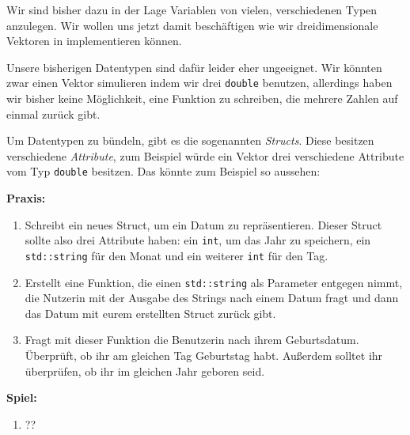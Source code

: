 
Wir sind bisher dazu in der Lage Variablen von vielen, verschiedenen Typen anzulegen.
Wir wollen uns jetzt damit beschäftigen wie wir dreidimensionale Vektoren in \Cpp implementieren können.

Unsere bisherigen Datentypen sind dafür leider eher ungeeignet.
Wir könnten zwar einen Vektor simulieren indem wir drei \texttt{double} benutzen, allerdings haben wir bisher keine Möglichkeit, eine Funktion zu schreiben, die mehrere Zahlen auf einmal zurück gibt.

Um Datentypen zu bündeln, gibt es die sogenannten \emph{Structs}.
Diese besitzen verschiedene \emph{Attribute}, zum Beispiel würde ein Vektor drei verschiedene Attribute vom Typ \texttt{double} besitzen.
Das könnte zum Beispiel so aussehen:


%

\textbf{Praxis:}
\begin{enumerate}
    \item Schreibt ein neues Struct, um ein Datum zu repräsentieren.
Dieser Struct sollte also drei Attribute haben:
    ein \texttt{int}, um das Jahr zu speichern,
    ein \texttt{std::string} für den Monat
    und ein weiterer \texttt{int} für den Tag.

    \item Erstellt eine Funktion, die einen \texttt{std::string} als Parameter entgegen nimmt, die Nutzerin mit der Ausgabe des Strings nach einem Datum fragt und dann das Datum mit eurem erstellten Struct zurück gibt.

    \item Fragt mit dieser Funktion die Benutzerin nach ihrem Geburtsdatum. Überprüft, ob ihr am gleichen Tag Geburtstag habt.
Außerdem solltet ihr überprüfen, ob ihr im gleichen Jahr geboren seid.
\end{enumerate}

\textbf{Spiel:}
\begin{enumerate}
    \item ??
\end{enumerate}
